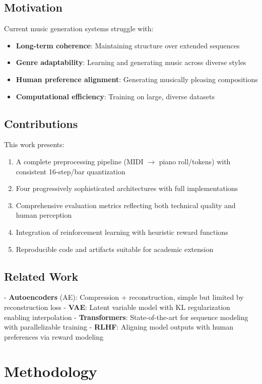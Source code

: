 \documentclass[conference]{IEEEtran}
\begin{document}
\subsection{Motivation}
Current music generation systems struggle with:
\begin{itemize}
\item \textbf{Long-term coherence}: Maintaining structure over extended sequences
\item \textbf{Genre adaptability}: Learning and generating music across diverse styles
\item \textbf{Human preference alignment}: Generating musically pleasing compositions
\item \textbf{Computational efficiency}: Training on large, diverse datasets
\end{itemize}

\subsection{Contributions}
This work presents:
\begin{enumerate}
\item A complete preprocessing pipeline (MIDI $\to$ piano roll/tokens) with consistent 16-step/bar quantization
\item Four progressively sophisticated architectures with full implementations
\item Comprehensive evaluation metrics reflecting both technical quality and human perception
\item Integration of reinforcement learning with heuristic reward functions
\item Reproducible code and artifacts suitable for academic extension
\end{enumerate}

\subsection{Related Work}
- \textbf{Autoencoders} (AE): Compression + reconstruction, simple but limited by reconstruction loss
- \textbf{VAE}: Latent variable model with KL regularization enabling interpolation
- \textbf{Transformers}: State-of-the-art for sequence modeling with parallelizable training
- \textbf{RLHF}: Aligning model outputs with human preferences via reward modeling

\section{Methodology}
\label{sec:methodology}
\end{document}
